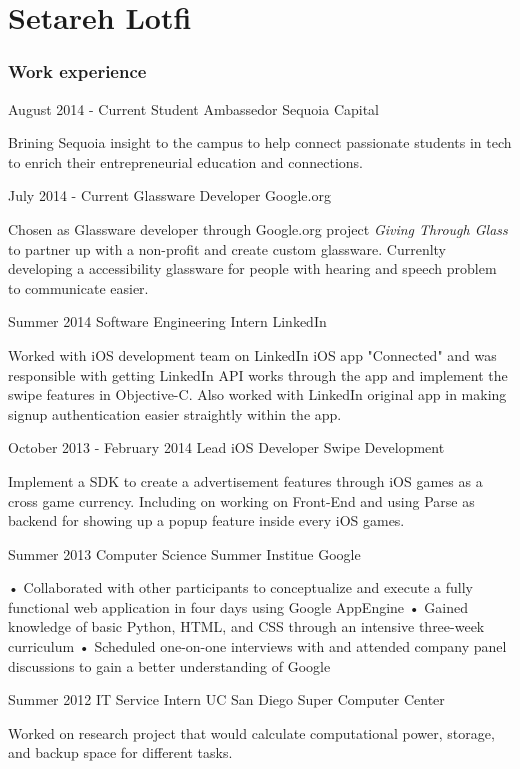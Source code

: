 \documentclass{tccv}
\begin{document}
\part{Setareh Lotfi}

\section{Work experience}

\begin{eventlist}

\item{August 2014 - Current}
     {Student Ambassedor}
     {Sequoia Capital}
     
Brining Sequoia insight to the campus to help connect passionate students in tech to enrich their entrepreneurial education and connections.


\item{July 2014 - Current}
     {Glassware Developer}
     {Google.org}

Chosen as Glassware developer through Google.org project \textit{Giving Through Glass} to partner up with a non-profit and create custom glassware. Currenlty developing a accessibility glassware for people with hearing and speech problem to communicate easier.

\item{Summer 2014}
     {Software Engineering Intern}
     {LinkedIn}

Worked with iOS development team on LinkedIn iOS app "Connected" and was responsible with getting LinkedIn API works through the app and implement the swipe features in Objective-C. Also worked with LinkedIn original app in making signup authentication easier straightly within the app. 

\item{October 2013 - February 2014}
     {Lead iOS Developer}
     {Swipe Development}

Implement a SDK to create a advertisement features through iOS games as a cross game currency. Including on working on Front-End and using Parse as backend for showing up a popup feature inside every iOS games.

\item{Summer 2013}
     {Computer Science Summer Institue}
     {Google}

• Collaborated with other participants to conceptualize and execute a fully functional web application in four days using Google AppEngine
• Gained knowledge of basic Python, HTML, and CSS through an intensive three-week curriculum
• Scheduled one-on-one interviews with and attended company panel discussions to gain a better understanding of Google

\item{Summer 2012}
     {IT Service Intern}
     {UC San Diego Super Computer Center}

Worked on research project that would calculate computational power, storage, and backup space for different tasks.

\end{eventlist}
\end{document}
